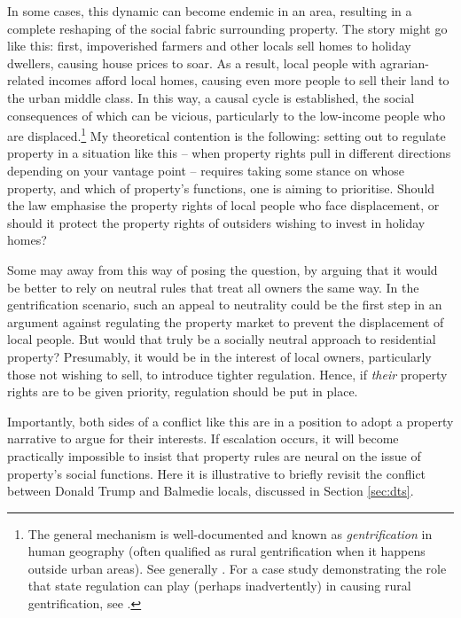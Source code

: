 In some cases, this dynamic can become endemic in an area, resulting in a complete reshaping of the social fabric surrounding property. The story might go like this: first, impoverished farmers and other locals sell homes to holiday dwellers, causing house prices to soar. As a result, local people with agrarian-related incomes  afford local homes, causing even more people to sell their land to the urban middle class. In this way, a causal cycle is established, the social consequences of which can be vicious, particularly to the low-income people who are displaced.\footnote{The general mechanism is well-documented and known as {\it gentrification} in human geography (often qualified as rural gentrification when it happens outside urban areas). See generally \cite{weesep94,phillips93,slater06}. For a case study demonstrating the role that state regulation can play (perhaps inadvertently) in causing rural gentrification, see \cite[1027-1030]{darling05}.} My theoretical contention is the following: setting out to regulate property in a situation like this -- when property rights pull in different directions depending on your vantage point -- requires taking some stance on whose property, and which of property's functions, one is aiming to prioritise. Should the law emphasise the property rights of local people who face displacement, or should it protect the property rights of outsiders wishing to invest in holiday homes? 

Some may  away from this way of posing the question, by arguing that it would be better to rely on neutral rules that treat all owners the same way. In the gentrification scenario, such an appeal to neutrality could be the first step in an argument against regulating the property market to prevent the displacement of local people. But would that truly be a socially neutral approach to residential property? Presumably, it would be in the interest of local owners, particularly those not wishing to sell, to introduce tighter regulation. Hence, if {\it their} property rights are to be given priority, regulation should be put in place.

Importantly, both sides of a conflict like this are in a position to adopt a property narrative to argue for their interests. If escalation occurs, it will become practically impossible to insist that  property rules are neural on the issue of property's social functions. Here it is illustrative to briefly revisit the conflict between Donald Trump and Balmedie locals, discussed in Section \ref{sec:dts}.

